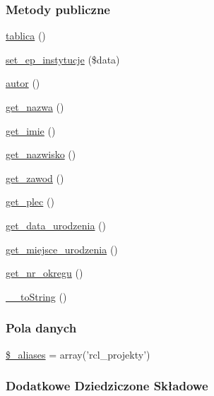 \subsubsection*{Metody publiczne}
\begin{DoxyCompactItemize}
\item 
\hyperlink{classep___r_c_l___projekt_a562ec137b68d83aa36dd84a6f26c3394}{tablica} ()
\item 
\hyperlink{classep___r_c_l___projekt_a1d4b47aa7cd504faefc542efb5a975a1}{set\-\_\-ep\-\_\-instytucje} (\$data)
\item 
\hyperlink{classep___r_c_l___projekt_abbc80445668f2cd4fc3f91e27afdaebe}{autor} ()
\item 
\hyperlink{classep___r_c_l___projekt_ac0818f0049d7b84f08f77128f54cee36}{get\-\_\-nazwa} ()
\item 
\hyperlink{classep___r_c_l___projekt_ac4b0c85dc2a130038f2d118dbd0c3d77}{get\-\_\-imie} ()
\item 
\hyperlink{classep___r_c_l___projekt_abdd1d7ff92508da7f748ba1feec97af0}{get\-\_\-nazwisko} ()
\item 
\hyperlink{classep___r_c_l___projekt_af80ca8310b60004454dd02a387deaa2c}{get\-\_\-zawod} ()
\item 
\hyperlink{classep___r_c_l___projekt_ac7f9af5c3fa024e4c26a7b6bd4ce4bb4}{get\-\_\-plec} ()
\item 
\hyperlink{classep___r_c_l___projekt_a880b240cd2d8c336fd1709bf0cb1ae2c}{get\-\_\-data\-\_\-urodzenia} ()
\item 
\hyperlink{classep___r_c_l___projekt_ac57c08ec5e394a19c5bd9280c8376182}{get\-\_\-miejsce\-\_\-urodzenia} ()
\item 
\hyperlink{classep___r_c_l___projekt_a2645a9f0aa5b0ccc482943348c033d0a}{get\-\_\-nr\-\_\-okregu} ()
\item 
\hyperlink{classep___r_c_l___projekt_a7516ca30af0db3cdbf9a7739b48ce91d}{\-\_\-\-\_\-to\-String} ()
\end{DoxyCompactItemize}
\subsubsection*{Pola danych}
\begin{DoxyCompactItemize}
\item 
\hyperlink{classep___r_c_l___projekt_ab4e31d75f0bc5d512456911e5d01366b}{\$\-\_\-aliases} = array('rcl\-\_\-projekty')
\end{DoxyCompactItemize}
\subsubsection*{Dodatkowe Dziedziczone Składowe}


